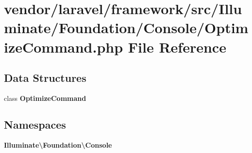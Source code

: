 \section{vendor/laravel/framework/src/\+Illuminate/\+Foundation/\+Console/\+Optimize\+Command.php File Reference}
\label{_optimize_command_8php}
\subsection*{Data Structures}
\begin{DoxyCompactItemize}
\item 
class {\bf Optimize\+Command}
\end{DoxyCompactItemize}
\subsection*{Namespaces}
\begin{DoxyCompactItemize}
\item 
 {\bf Illuminate\textbackslash{}\+Foundation\textbackslash{}\+Console}
\end{DoxyCompactItemize}
